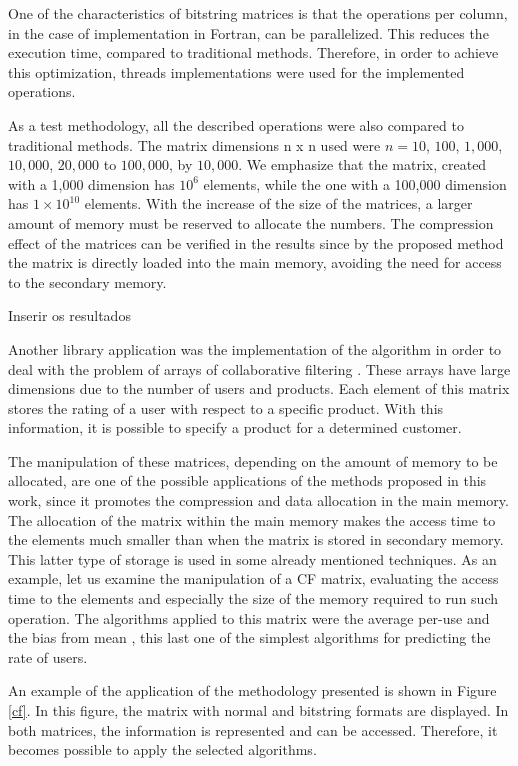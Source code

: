 \documentclass[10pt]{article}
\begin{document}
One of the characteristics of bitstring matrices is that the operations per column, in the case of implementation in 
Fortran, can be parallelized. This reduces the execution time, compared to traditional methods. Therefore, in order to 
achieve this optimization, threads implementations were used for the implemented operations.

As a test methodology, all the described operations were also compared to traditional methods. The matrix dimensions n x 
n used were $n = 10$, $100$, $1,000$, $10,000$, $20,000$ to $100,000$, by $10,000$. We emphasize that the matrix,  
created with a 1,000 dimension has $10^6$ elements, while the one with a 100,000 dimension has $1 \times 10^{10}$ 
elements. With the increase of the size of the matrices, a larger amount of memory must be reserved to allocate the 
numbers. The compression effect of the matrices can be verified in the results since by the proposed method the matrix 
is ​​directly loaded into the main memory, avoiding the need for access to the secondary memory.

Inserir os resultados

Another library application was the implementation of the algorithm in order to deal with the problem of arrays of 
collaborative filtering \cite{cf}. These arrays have large dimensions due to the number of users and products. Each 
element of this matrix stores the rating of a user with respect to a specific product. With this information, it is 
possible to specify a product for a determined customer.

The manipulation of these matrices, depending on the amount of memory to be allocated, are one of the possible 
applications of the methods proposed in this work, since it promotes the compression and data allocation in the main 
memory. The allocation of the matrix within the main memory makes the access time to the elements much smaller than when 
the matrix is stored in secondary memory. This latter type of storage is used in some already mentioned techniques. As 
an example, let us examine the manipulation of a CF matrix, evaluating the access time to the elements and especially 
the size of the memory required to run such operation. The algorithms applied to this matrix were the average per-use 
and the bias from mean \cite{cf}, this last one of the simplest algorithms for predicting the rate of users.

An example of the application of the methodology presented is shown in Figure \ref{cf}. In this figure, the matrix with 
normal and bitstring formats are displayed. In both matrices, the information is represented and can be accessed. 
Therefore, it becomes possible to apply the selected algorithms.
\end{document}
